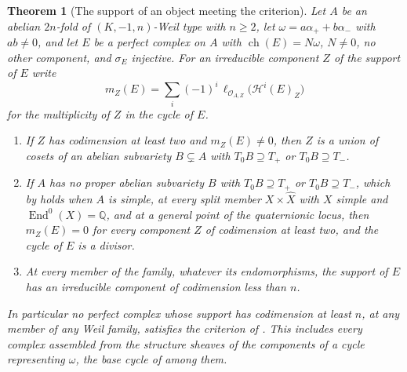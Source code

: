 \documentclass[11pt,reqno]{amsart}
\theoremstyle{plain}
\newtheorem{theorem}{Theorem}[section]
\theoremstyle{definition}
\theoremstyle{remark}
\newcommand{\QQ}{\mathbb{Q}}
\newcommand{\cO}{\mathcal{O}}
\newcommand{\cH}{\mathcal{H}}
\DeclareMathOperator{\ch}{ch}
\DeclareMathOperator{\End}{End}
\begin{document}
\begin{theorem}[The support of an object meeting the criterion]
\label{thm:p2support}
Let $A$ be an abelian $2n$-fold of $(K,-1,n)$-Weil type with $n\ge2$, let
$\omega=a\alpha_{+}+b\alpha_{-}$ with $ab\ne0$, and let $E$ be a perfect
complex on $A$ with $\ch(E)=N\omega$, $N\ne0$, no other component, and
$\sigma_{E}$ injective. For an irreducible component $Z$ of the support of $E$
write
\[
  m_{Z}(E)=\sum_{i}(-1)^{i}\,\ell_{\cO_{A,Z}}\bigl(\cH^{i}(E)_{Z}\bigr)
\]
for the multiplicity of $Z$ in the cycle of $E$.
\begin{enumerate}[label=\textup{(\roman*)},leftmargin=2.6em,itemsep=2pt]
\item If $Z$ has codimension at least two and $m_{Z}(E)\ne0$, then $Z$ is a
  union of cosets of an abelian subvariety $B\subsetneq A$ with
  $T_{0}B\supseteq T_{+}$ or $T_{0}B\supseteq T_{-}$.
\item If $A$ has no proper abelian subvariety $B$ with $T_{0}B\supseteq T_{+}$
  or $T_{0}B\supseteq T_{-}$, which by  holds when $A$ is
  simple, at every split member $X\times\widehat X$ with $X$ simple and
  $\End^{0}(X)=\QQ$, and at a general point of the quaternionic locus, then
  $m_{Z}(E)=0$ for every component $Z$ of codimension at least two, and the
  cycle of $E$ is a divisor.
\item \enlargethispage{6pt}At every member of the family, whatever its endomorphisms, the support
  of $E$ has an irreducible component of codimension less than $n$.
\end{enumerate}
In particular no perfect complex whose support has codimension at least $n$,
at any member of any Weil family, satisfies the criterion of
. This includes every complex assembled from the
structure sheaves of the components of a cycle representing $\omega$, the base
cycle of \cite[Theorem~15.27]{paperI} among them.
\end{theorem}
\end{document}
